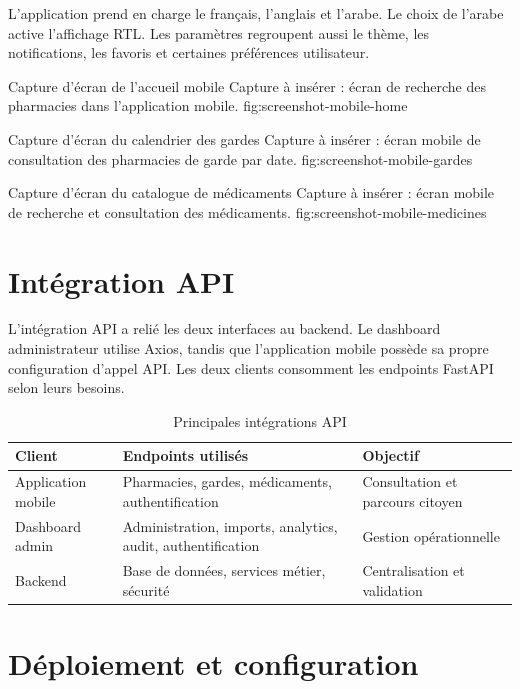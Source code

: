L'application prend en charge le français, l'anglais et l'arabe. Le choix de l'arabe active l'affichage RTL.
Les paramètres regroupent aussi le thème, les notifications, les favoris et certaines préférences
utilisateur.

\placeholderfigure
{Capture d'écran de l'accueil mobile}
{Capture à insérer : écran de recherche des pharmacies dans l'application mobile.}
{fig:screenshot-mobile-home}

\placeholderfigure
{Capture d'écran du calendrier des gardes}
{Capture à insérer : écran mobile de consultation des pharmacies de garde par date.}
{fig:screenshot-mobile-gardes}

\placeholderfigure
{Capture d'écran du catalogue de médicaments}
{Capture à insérer : écran mobile de recherche et consultation des médicaments.}
{fig:screenshot-mobile-medicines}

\section{Intégration API}

L'intégration API a relié les deux interfaces au backend. Le dashboard administrateur utilise Axios, tandis
que l'application mobile possède sa propre configuration d'appel API. Les deux clients consomment les
endpoints FastAPI selon leurs besoins.

\begin{table}[H]
    \centering
    \caption{Principales intégrations API}
    \begin{tabular}{L{4cm}L{5cm}L{4cm}}
        \toprule
        \textbf{Client} & \textbf{Endpoints utilisés} & \textbf{Objectif} \\
        \midrule
        Application mobile & Pharmacies, gardes, médicaments, authentification & Consultation et parcours citoyen \\
        Dashboard admin & Administration, imports, analytics, audit, authentification & Gestion opérationnelle \\
        Backend & Base de données, services métier, sécurité & Centralisation et validation \\
        \bottomrule
    \end{tabular}
\end{table}

\section{Déploiement et configuration}

